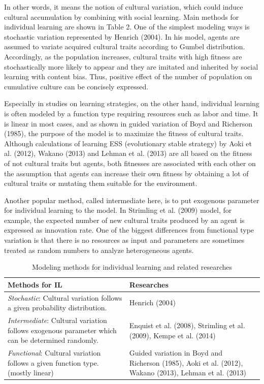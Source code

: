 \documentclass[a4paper, dvipdfmx]{article}
\begin{document}
\noindent In other words, it means the notion of cultural variation, which could induce cultural accumulation by combining with social learning. Main methods for individual learning are shown in Table 2. One of the simplest modeling ways is stochastic variation represented by Henrich (2004). In his model, agents are assumed to variate acquired cultural traits according to Gumbel distribution. Accordingly, as the population increases, cultural traits with high fitness are stochastically more likely to appear and they are imitated and inherited by social learning with content bias. Thus, positive effect of the number of population on cumulative culture can be concisely expressed.

Especially in studies on learning strategies, on the other hand, individual learning is often modeled by a function type requiring resources such as labor and time. It is linear in most cases, and as shown in guided variation of Boyd and Richerson (1985), the purpose of the model is to maximize the fitness of cultural traits. Although calculations of learning ESS (evolutionary stable strategy) by Aoki et al. (2012), Wakano (2013) and Lehman et al. (2013) are all based on the fitness of not cultural traits but agents, both fitnesses are associated with each other on the assumption that agents can increase their own fitness by obtaining a lot of cultural traits or mutating them suitable for the environment.

Another popular method, called intermediate here, is to put exogenous parameter for individual learning to the model. In Strimling et al. (2009) model, for example, the expected number of new cultural traits produced by an agent is expressed as innovation rate. One of the biggest differences from functional type variation is that there is no resources as input and parameters are sometimes treated as random numbers to analyze heterogeneous agents.

\begin{table}[hbt]
    \centering
    \caption{Modeling methods for individual learning and related researches}
    \begin{tabularx}{.9\linewidth}{XXX}
        \toprule
        Methods for IL & Researches \\
        \midrule
        {\it Stochastic}: Cultural variation follows a given probability distribution. & Henrich (2004) \\ \midrule
        {\it Intermediate}: Cultural variation follows exogenous parameter which can be determined randomly. & Enquist et al. (2008), Strimling et al. (2009), Kempe et al. (2014) \\ \midrule
        {\it Functional}: Cultural variation follows a given function type. (mostly linear) & Guided variation in Boyd and Richerson (1985), Aoki et al. (2012), Wakano (2013), Lehman et al. (2013) \\ \bottomrule
    \end{tabularx}
\end{table}
\end{document}
